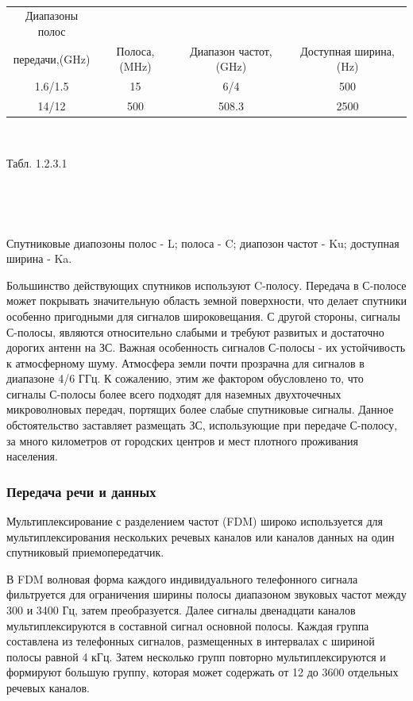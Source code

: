 \documentclass[a4paper]{report}
\begin{document}
~

{\centering\begin{tabular}[c]{|c|c|c|c|}
\hline
Диапазоны полос \\  передачи,(GHz) & Полоса,(MHz) & Диапазон частот,(GHz) & Доступная ширина,(Hz)  \\
\hline
1.6/1.5 & 15 & 	6/4  & 	500\\
14/12 & 500 & 508.3  & 2500\\
\hline
\end{tabular}}

~

{\centering\caption{\newline Табл. 1.2.3.1 }\\}

~

Спутниковые диапозоны полос - L; полоса - C; диапозон частот - Ku; доступная ширина - Ka.

Большинство действующих спутников используют C-полосу. Передача в С-полосе может покрывать значительную область земной поверхности, что делает спутники особенно пригодными для сигналов широковещания. С другой стороны, сигналы С-полосы, являются относительно слабыми и требуют развитых и достаточно дорогих антенн на ЗС. Важная особенность сигналов С-полосы - их устойчивость к атмосферному шуму. Атмосфера земли почти прозрачна для сигналов в диапазоне 4/6 ГГц. К сожалению, этим же фактором обусловлено то, что сигналы С-полосы более всего подходят для наземных двухточечных микроволновых передач, портящих более слабые спутниковые сигналы. Данное обстоятельство заставляет размещать ЗС, использующие при передаче С-полосу, за много километров от городских центров и мест плотного проживания населения.

\subsubsection{Передача речи и данных}
Мультиплексирование с разделением частот (FDM) широко используется для мультиплексирования нескольких речевых каналов или каналов данных на один спутниковый приемопередатчик.

В FDM волновая форма каждого индивидуального телефонного сигнала фильтруется для ограничения ширины полосы диапазоном звуковых частот между 300 и 3400 Гц, затем преобразуется. Далее сигналы двенадцати каналов мультиплексируются в составной сигнал основной полосы. Каждая группа составлена из телефонных сигналов, размещенных в интервалах с шириной полосы равной 4 кГц. Затем несколько групп повторно мультиплексируются и формируют большую группу, которая может содержать от 12 до 3600 отдельных речевых каналов.
\end{document}
